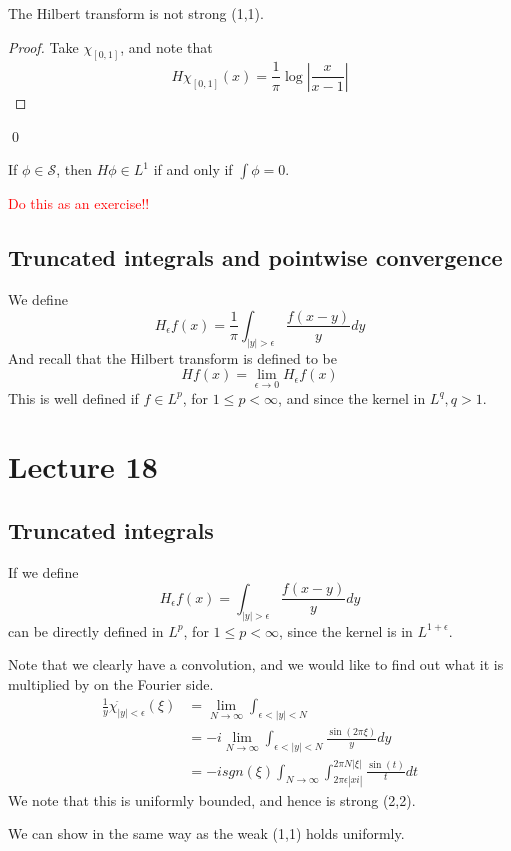 \begin{proposition}
    The Hilbert transform is not strong (1,1).
\end{proposition}
\begin{proof}
    Take $\chi_{[0,1]}$, and note that
    \begin{equation*}
        H\chi_{[0,1]}(x)=\frac{1}{\pi}\log\left|\frac{x}{x-1} \right|
    \end{equation*}
\end{proof}
\qed

\begin{proposition}
    If $\phi\in\mathcal{S}$, then $H\phi\in L^1$ if and only if $\int\phi=0$.
\end{proposition}
\begin{note}
    \textcolor{red}{Do this as an exercise!!}
\end{note}

\subsection{Truncated integrals and pointwise convergence}
We define
\begin{equation*}
    H_\epsilon f(x)=\frac{1}{\pi}\int_{|y|>\epsilon}\frac{f(x-y)}{y}dy
\end{equation*}
And recall that the Hilbert transform is defined to be 
\begin{equation*}
    Hf(x)=\lim_{\epsilon\to 0}H_\epsilon f(x)
\end{equation*}
This is well defined if $f\in L^p$, for $1\leq p<\infty$, and since the kernel in $L^q, q>1$.


\section{Lecture 18}
\subsection{Truncated integrals}
If we define
\begin{equation*}
    H_\epsilon f(x)=\int_{|y|>\epsilon}\frac{f(x-y)}{y}dy
\end{equation*}
can be directly defined in $L^p$, for $1\leq p<\infty$, since the kernel is in $L^{1+\epsilon}$.

Note that we clearly have a convolution, and we would like to find out what it is multiplied by on the Fourier side.
\begin{align*}
    \frac{1}{y}\chi_{|y|<\epsilon}^{\widehat{\phantom{.}}}(\xi)&=
    \lim_{N\to\infty}\int_{\epsilon<|y|< N}\\
    &=-i\lim_{N\to\infty}\int_{\epsilon<|y|<N}\frac{\sin(2\pi\xi)}{y}dy\\
    &=-isgn(\xi)\int_{N\to\infty}\int_{2\pi\epsilon|xi|}^{2\pi N|\xi|}\frac{\sin(t)}{t}dt
\end{align*}
We note that this is uniformly bounded, and hence is strong (2,2).
\begin{note}
    We can show in the same way as the weak (1,1) holds uniformly.
\end{note}

